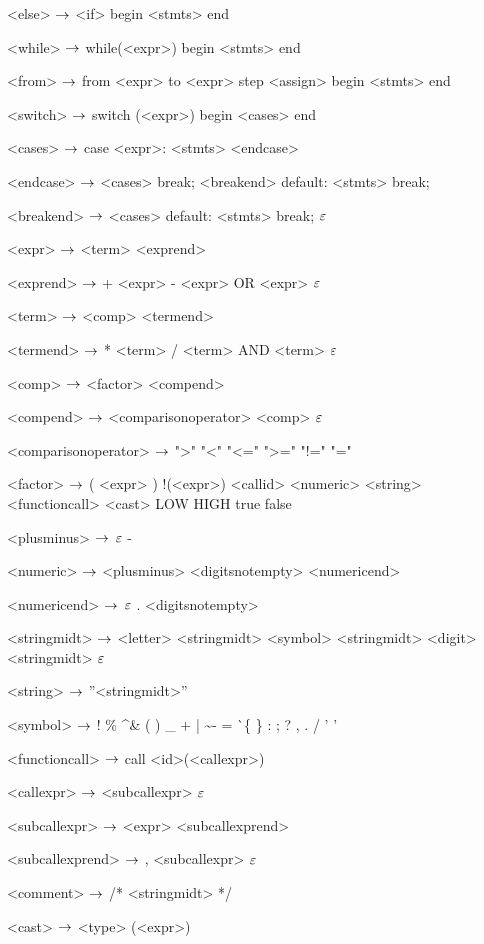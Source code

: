 \begin{grammar}
<else> $\rightarrow$ <if>
	\alt begin
		<stmts>
	end

<while> $\rightarrow$ while(<expr>)
		begin
			<stmts>
		end
		
<from> $\rightarrow$ from <expr> to <expr> step <assign>
	begin
		<stmts>
	end

<switch> $\rightarrow$ switch (<expr>)
		begin
			<cases>
		end

<cases> $\rightarrow$ case <expr>:
			<stmts>
		<endcase>
		
<endcase> $\rightarrow$ <cases>
		\alt break; <breakend>
		\alt default:
			<stmts>
			break;

<breakend> $\rightarrow$ <cases>
\alt default:
<stmts>
break;
\alt $\varepsilon$

<expr> $\rightarrow$ <term> <exprend>

<exprend> $\rightarrow$ + <expr>
\alt - <expr>
\alt OR <expr>
\alt $\varepsilon$

<term> $\rightarrow$ <comp> <termend>

<termend> $\rightarrow$ * <term>
\alt / <term>
\alt AND <term>
\alt $\varepsilon$

<comp> $\rightarrow$ <factor> <compend>

<compend> $\rightarrow$ <comparisonoperator> <comp>
\alt $\varepsilon$

<comparisonoperator> $\rightarrow$ ">"
				\alt "<"
				\alt "<="
				\alt ">="
				\alt "!="
				\alt "="

<factor> $\rightarrow$ ( <expr> )
	\alt !(<expr>)
	\alt <callid>
	\alt <numeric>
	\alt <string>
	\alt <functioncall> 
	\alt <cast>
	\alt LOW
	\alt HIGH
	\alt true
	\alt false

<plusminus> $\rightarrow$ $\varepsilon$
	\alt -

<numeric> $\rightarrow$ <plusminus> <digitsnotempty> <numericend>

<numericend> $\rightarrow$ $\varepsilon$
\alt . <digitsnotempty>

<stringmidt> $\rightarrow$ <letter> <stringmidt>
\alt <symbol> <stringmidt>
\alt <digit> <stringmidt>
\alt $\varepsilon$

<string> $\rightarrow$ ''<stringmidt>''

<symbol> $\rightarrow$ !
\alt \%
\alt \^
\alt \&
\alt (
\alt )
\alt \_
\alt +
\alt |
\alt \~
\alt -
\alt =
\alt \`
\alt \{
\alt \}
\alt [
\alt ]
\alt :
\alt ;
\alt ?
\alt ,
\alt .
\alt /
\alt ' '

<functioncall> $\rightarrow$ call <id>(<callexpr>)

<callexpr> $\rightarrow$ <subcallexpr>
\alt $\varepsilon$

<subcallexpr> $\rightarrow$ <expr> <subcallexprend>

<subcallexprend> $\rightarrow$ , <subcallexpr>
\alt $\varepsilon$

<comment> $\rightarrow$ /* <stringmidt> */

<cast> $\rightarrow$ <type> (<expr>)

\end{grammar}